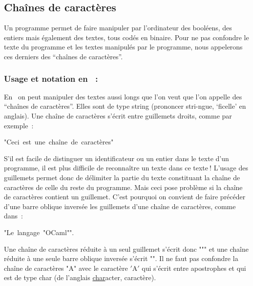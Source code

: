 \subsection{Chaînes de caractères}

Un programme permet de faire manipuler par l'ordinateur des booléens, des entiers mais
également des textes, tous codés en binaire. Pour ne pas confondre le texte du programme
et les textes manipulés par le programme, nous appelerons ces derniers des ``chaînes de
caractères''.

\subsubsection{Usage et notation en \protect\ocaml~:}
En \ocaml\ on peut manipuler des textes aussi longs que l'on veut que l'on appelle des
``chaînes de caractères''. Elles sont de type {\idt string} (prononcer stri-ngue, `ficelle'
en anglais). Une chaîne de caractères s'écrit entre guillemets droits, comme par exemple~:
\begin{center}
{\cha "Ceci\ est\ une\ chaîne\ de\ caractères"}
\end{center}
S'il est facile de distinguer un identificateur ou un entier dans le texte d'un
programme, il est plus difficile de reconnaître un texte dans ce texte$\:$! L'usage des guillemets permet donc de
délimiter la partie du texte constituant la chaîne de caractères de celle du reste du programme. Mais ceci pose
problème si la chaîne de caractères contient un guillemet. C'est pourquoi on convient de faire précéder
d'une barre oblique inversée {\cha {}} les guillemets d'une chaîne de caractères,
comme dans~:
\begin{center}
{\cha "Le\ langage\ "OCaml""}.
\end{center}
Une chaîne de caractères réduite à un seul guillemet s'écrit donc
{\cha """} et une chaîne réduite à une seule barre oblique inversée s'écrit
{\cha ""}. Il ne faut pas confondre la chaîne de caractères {\cha "A"}
avec le caractère {\cha $\scriptstyle '$A$\scriptstyle '$} qui s'écrit entre apostrophes
et qui est de type {\idt char} (de l'anglais \underline{char}acter, caractère).

